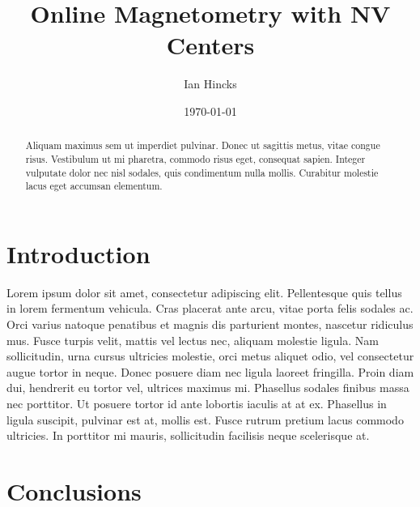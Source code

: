 \documentclass{quantumarticle}
\begin{document}
\title{Online Magnetometry with NV Centers}

\author{Ian Hincks}
\affilUWAMath
\affilIQC


\date{\today}

\maketitle

\begin{abstract}
    Aliquam maximus sem ut imperdiet pulvinar. Donec ut sagittis metus, vitae congue risus. Vestibulum ut mi pharetra, commodo risus eget, consequat sapien. Integer vulputate dolor nec nisl sodales, quis condimentum nulla mollis. Curabitur molestie lacus eget accumsan elementum. 
\end{abstract}





\section{Introduction}
\label{sec:intro}

 Lorem ipsum dolor sit amet, consectetur adipiscing elit. Pellentesque quis tellus in lorem fermentum vehicula. Cras placerat ante arcu, vitae porta felis sodales ac. Orci varius natoque penatibus et magnis dis parturient montes, nascetur ridiculus mus. Fusce turpis velit, mattis vel lectus nec, aliquam molestie ligula. Nam sollicitudin, urna cursus ultricies molestie, orci metus aliquet odio, vel consectetur augue tortor in neque. Donec posuere diam nec ligula laoreet fringilla. Proin diam dui, hendrerit eu tortor vel, ultrices maximus mi. Phasellus sodales finibus massa nec porttitor. Ut posuere tortor id ante lobortis iaculis at at ex. Phasellus in ligula suscipit, pulvinar est at, mollis est. Fusce rutrum pretium lacus commodo ultricies. In porttitor mi mauris, sollicitudin facilisis neque scelerisque at.


\section{Conclusions}
\label{sec:conclusions}
\end{document}
